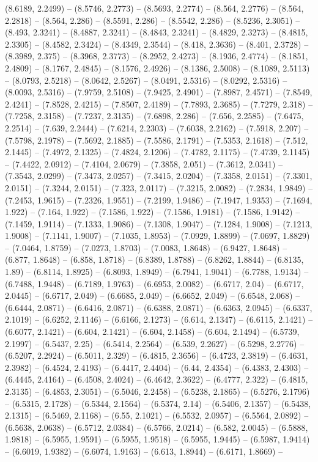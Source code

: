 (8.6189, 2.2499) -- (8.5746, 2.2773) -- (8.5693, 2.2774) -- (8.564, 2.2776) -- (8.564, 2.2818) -- (8.564, 2.286) -- (8.5591, 2.286) -- (8.5542, 2.286) -- (8.5236, 2.3051) -- (8.493, 2.3241) -- (8.4887, 2.3241) -- (8.4843, 2.3241) -- (8.4829, 2.3273) -- (8.4815, 2.3305) -- (8.4582, 2.3424) -- (8.4349, 2.3544) -- (8.418, 2.3636) -- (8.401, 2.3728) -- (8.3989, 2.375) -- (8.3968, 2.3773) -- (8.2952, 2.4273) -- (8.1936, 2.4774) -- (8.1851, 2.4809) -- (8.1767, 2.4845) -- (8.1576, 2.4926) -- (8.1386, 2.5008) -- (8.1089, 2.5113) -- (8.0793, 2.5218) -- (8.0642, 2.5267) -- (8.0491, 2.5316) -- (8.0292, 2.5316) -- (8.0093, 2.5316) -- (7.9759, 2.5108) -- (7.9425, 2.4901) -- (7.8987, 2.4571) -- (7.8549, 2.4241) -- (7.8528, 2.4215) -- (7.8507, 2.4189) -- (7.7893, 2.3685) -- (7.7279, 2.318) -- (7.7258, 2.3158) -- (7.7237, 2.3135) -- (7.6898, 2.286) -- (7.656, 2.2585) -- (7.6475, 2.2514) -- (7.639, 2.2444) -- (7.6214, 2.2303) -- (7.6038, 2.2162) -- (7.5918, 2.207) -- (7.5798, 2.1978) -- (7.5692, 2.1885) -- (7.5586, 2.1791) -- (7.5353, 2.1618) -- (7.512, 2.1445) -- (7.4972, 2.1325) -- (7.4824, 2.1206) -- (7.4782, 2.1175) -- (7.4739, 2.1145) -- (7.4422, 2.0912) -- (7.4104, 2.0679) -- (7.3858, 2.051) -- (7.3612, 2.0341) -- (7.3543, 2.0299) -- (7.3473, 2.0257) -- (7.3415, 2.0204) -- (7.3358, 2.0151) -- (7.3301, 2.0151) -- (7.3244, 2.0151) -- (7.323, 2.0117) -- (7.3215, 2.0082) -- (7.2834, 1.9849) -- (7.2453, 1.9615) -- (7.2326, 1.9551) -- (7.2199, 1.9486) -- (7.1947, 1.9353) -- (7.1694, 1.922) -- (7.164, 1.922) -- (7.1586, 1.922) -- (7.1586, 1.9181) -- (7.1586, 1.9142) -- (7.1459, 1.9114) -- (7.1333, 1.9086) -- (7.1308, 1.9047) -- (7.1284, 1.9008) -- (7.1213, 1.9008) -- (7.1141, 1.9007) -- (7.1035, 1.8953) -- (7.0929, 1.8899) -- (7.0697, 1.8829) -- (7.0464, 1.8759) -- (7.0273, 1.8703) -- (7.0083, 1.8648) -- (6.9427, 1.8648) -- (6.877, 1.8648) -- (6.858, 1.8718) -- (6.8389, 1.8788) -- (6.8262, 1.8844) -- (6.8135, 1.89) -- (6.8114, 1.8925) -- (6.8093, 1.8949) -- (6.7941, 1.9041) -- (6.7788, 1.9134) -- (6.7488, 1.9448) -- (6.7189, 1.9763) -- (6.6953, 2.0082) -- (6.6717, 2.04) -- (6.6717, 2.0445) -- (6.6717, 2.049) -- (6.6685, 2.049) -- (6.6652, 2.049) -- (6.6548, 2.068) -- (6.6444, 2.0871) -- (6.6416, 2.0871) -- (6.6388, 2.0871) -- (6.6363, 2.0945) -- (6.6337, 2.1019) -- (6.6252, 2.1146) -- (6.6166, 2.1273) -- (6.614, 2.1347) -- (6.6115, 2.1421) -- (6.6077, 2.1421) -- (6.604, 2.1421) -- (6.604, 2.1458) -- (6.604, 2.1494) -- (6.5739, 2.1997) -- (6.5437, 2.25) -- (6.5414, 2.2564) -- (6.539, 2.2627) -- (6.5298, 2.2776) -- (6.5207, 2.2924) -- (6.5011, 2.329) -- (6.4815, 2.3656) -- (6.4723, 2.3819) -- (6.4631, 2.3982) -- (6.4524, 2.4193) -- (6.4417, 2.4404) -- (6.44, 2.4354) -- (6.4383, 2.4303) -- (6.4445, 2.4164) -- (6.4508, 2.4024) -- (6.4642, 2.3622) -- (6.4777, 2.322) -- (6.4815, 2.3135) -- (6.4853, 2.3051) -- (6.5046, 2.2458) -- (6.5238, 2.1865) -- (6.5276, 2.1796) -- (6.5315, 2.1728) -- (6.5344, 2.1564) -- (6.5374, 2.14) -- (6.5406, 2.1357) -- (6.5438, 2.1315) -- (6.5469, 2.1168) -- (6.55, 2.1021) -- (6.5532, 2.0957) -- (6.5564, 2.0892) -- (6.5638, 2.0638) -- (6.5712, 2.0384) -- (6.5766, 2.0214) -- (6.582, 2.0045) -- (6.5888, 1.9818) -- (6.5955, 1.9591) -- (6.5955, 1.9518) -- (6.5955, 1.9445) -- (6.5987, 1.9414) -- (6.6019, 1.9382) -- (6.6074, 1.9163) -- (6.613, 1.8944) -- (6.6171, 1.8669) -- 